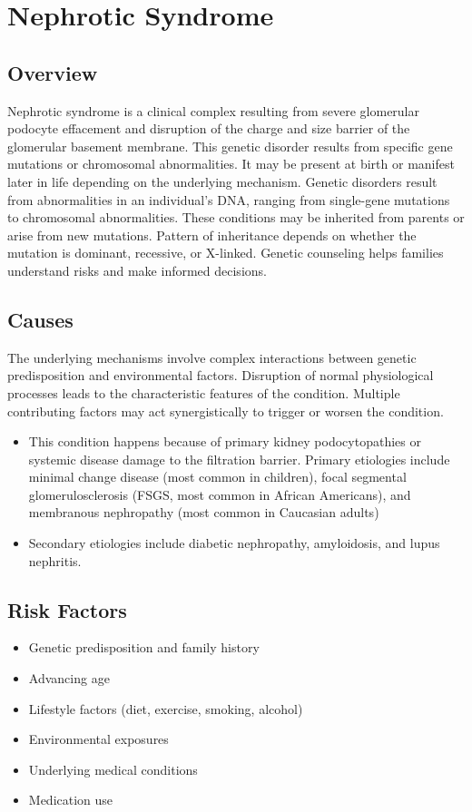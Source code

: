 \chapter{Nephrotic Syndrome}
\label{sec:Nephrotic Syndrome}

\section{Overview}
Nephrotic syndrome is a clinical complex resulting from severe glomerular podocyte effacement and disruption of the charge and size barrier of the glomerular basement membrane. This genetic disorder results from specific gene mutations or chromosomal abnormalities. It may be present at birth or manifest later in life depending on the underlying mechanism. Genetic disorders result from abnormalities in an individual's DNA, ranging from single-gene mutations to chromosomal abnormalities. These conditions may be inherited from parents or arise from new mutations. Pattern of inheritance depends on whether the mutation is dominant, recessive, or X-linked. Genetic counseling helps families understand risks and make informed decisions.
\section{Causes}
The underlying mechanisms involve complex interactions between genetic predisposition and environmental factors. Disruption of normal physiological processes leads to the characteristic features of the condition. Multiple contributing factors may act synergistically to trigger or worsen the condition.

\begin{itemize}[noitemsep]
  \item This condition happens because of primary kidney podocytopathies or systemic disease damage to the filtration barrier. Primary etiologies include minimal change disease (most common in children), focal segmental glomerulosclerosis (FSGS, most common in African Americans), and membranous nephropathy (most common in Caucasian adults)
  \item Secondary etiologies include diabetic nephropathy, amyloidosis, and lupus nephritis.
\end{itemize}
\section{Risk Factors}


\begin{itemize}[noitemsep]
  \item Genetic predisposition and family history
  \item Advancing age
  \item Lifestyle factors (diet, exercise, smoking, alcohol)
  \item Environmental exposures
  \item Underlying medical conditions
  \item Medication use
\end{itemize}
